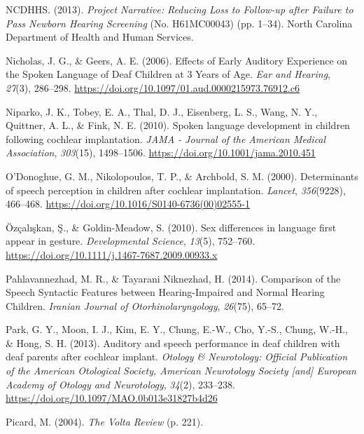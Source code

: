 \documentclass[english,man]{apa6}
\begin{document}
\leavevmode\hypertarget{ref-ncdhhs2013}{}%
NCDHHS. (2013). \emph{Project Narrative: Reducing Loss to Follow-up after Failure to Pass Newborn Hearing Screening} (No. H61MC00043) (pp. 1--34). North Carolina Department of Health and Human Services.

\leavevmode\hypertarget{ref-nicholas2006}{}%
Nicholas, J. G., \& Geers, A. E. (2006). Effects of Early Auditory Experience on the Spoken Language of Deaf Children at 3 Years of Age. \emph{Ear and Hearing}, \emph{27}(3), 286--298. \url{https://doi.org/10.1097/01.aud.0000215973.76912.c6}

\leavevmode\hypertarget{ref-niparko2010}{}%
Niparko, J. K., Tobey, E. A., Thal, D. J., Eisenberg, L. S., Wang, N. Y., Quittner, A. L., \& Fink, N. E. (2010). Spoken language development in children following cochlear implantation. \emph{JAMA - Journal of the American Medical Association}, \emph{303}(15), 1498--1506. \url{https://doi.org/10.1001/jama.2010.451}

\leavevmode\hypertarget{ref-odonoghue2000}{}%
O'Donoghue, G. M., Nikolopoulos, T. P., \& Archbold, S. M. (2000). Determinants of speech perception in children after cochlear implantation. \emph{Lancet}, \emph{356}(9228), 466--468. \url{https://doi.org/10.1016/S0140-6736(00)02555-1}

\leavevmode\hypertarget{ref-ozcaliskan2010}{}%
Özçalışkan, Ş., \& Goldin-Meadow, S. (2010). Sex differences in language first appear in gesture. \emph{Developmental Science}, \emph{13}(5), 752--760. \url{https://doi.org/10.1111/j.1467-7687.2009.00933.x}

\leavevmode\hypertarget{ref-pahlavannezhad2014}{}%
Pahlavannezhad, M. R., \& Tayarani Niknezhad, H. (2014). Comparison of the Speech Syntactic Features between Hearing-Impaired and Normal Hearing Children. \emph{Iranian Journal of Otorhinolaryngology}, \emph{26}(75), 65--72.

\leavevmode\hypertarget{ref-park2013}{}%
Park, G. Y., Moon, I. J., Kim, E. Y., Chung, E.-W., Cho, Y.-S., Chung, W.-H., \& Hong, S. H. (2013). Auditory and speech performance in deaf children with deaf parents after cochlear implant. \emph{Otology \& Neurotology: Official Publication of the American Otological Society, American Neurotology Society {[}and{]} European Academy of Otology and Neurotology}, \emph{34}(2), 233--238. \url{https://doi.org/10.1097/MAO.0b013e31827b4d26}

\leavevmode\hypertarget{ref-picard2004}{}%
Picard, M. (2004). \emph{The Volta Review} (p. 221).
\end{document}
